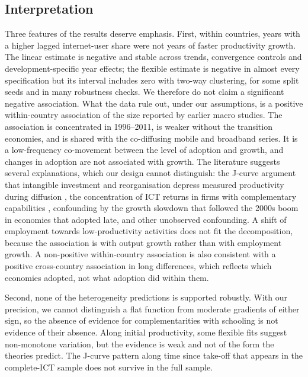 \documentclass[pdflatex,sn-basic]{sn-jnl}%
\theoremstyle{thmstyleone}
\theoremstyle{thmstyletwo}
\begin{document}
\subsection{Interpretation}

Three features of the results deserve emphasis. First, within countries, years with a higher lagged internet-user share were not years of faster productivity growth. The linear estimate is negative and stable across trends, convergence controls and development-specific year effects; the flexible estimate is negative in almost every specification but its interval includes zero with two-way clustering, for some split seeds and in many robustness checks. We therefore do not claim a significant negative association. What the data rule out, under our assumptions, is a positive within-country association of the size reported by earlier macro studies. The association is concentrated in 1996--2011, is weaker without the transition economies, and is shared with the co-diffusing mobile and broadband series. It is a low-frequency co-movement between the level of adoption and growth, and changes in adoption are not associated with growth. The literature suggests several explanations, which our design cannot distinguish: the J-curve argument that intangible investment and reorganisation depress measured productivity during diffusion \citep{brynjolfsson2021jcurve}, the concentration of ICT returns in firms with complementary capabilities \citep{gal2019digitalisation,nicoletti2020diffusion}, confounding by the growth slowdown that followed the 2000s boom in economies that adopted late, and other unobserved confounding. A shift of employment towards low-productivity activities does not fit the decomposition, because the association is with output growth rather than with employment growth. A non-positive within-country association is also consistent with a positive cross-country association in long differences, which reflects which economies adopted, not what adoption did within them.

Second, none of the heterogeneity predictions is supported robustly. With our precision, we cannot distinguish a flat function from moderate gradients of either sign, so the absence of evidence for complementarities with schooling is not evidence of their absence. Along initial productivity, some flexible fits suggest non-monotone variation, but the evidence is weak and not of the form the theories predict. The J-curve pattern along time since take-off that appears in the complete-ICT sample does not survive in the full sample.
\end{document}
